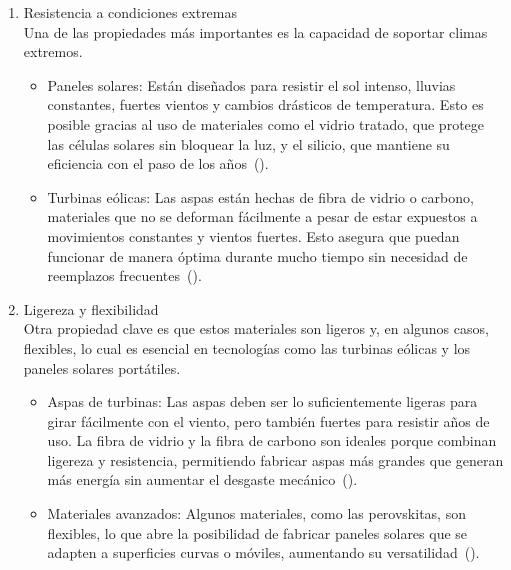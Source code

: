 \documentclass[letterpaper, 12pt]{article}
\begin{document}
\begin{enumerate}
      \item Resistencia a condiciones extremas \\ Una de las propiedades más importantes es
            la capacidad de soportar climas extremos.
            \begin{itemize}
                  \item Paneles solares: Están diseñados para resistir el sol intenso, lluvias
                        constantes, fuertes vientos y cambios drásticos de temperatura. Esto es posible
                        gracias al uso de materiales como el vidrio tratado, que protege las células
                        solares sin bloquear la luz, y el silicio, que mantiene su eficiencia con el
                        paso de los años~(\cite{Henriksson2021}).
                  \item Turbinas eólicas: Las aspas están hechas de fibra de vidrio o carbono,
                        materiales que no se deforman fácilmente a pesar de estar expuestos a
                        movimientos constantes y vientos fuertes. Esto asegura que puedan funcionar de
                        manera óptima durante mucho tiempo sin necesidad de reemplazos
                        frecuentes~(\cite{Galembeck2019}).
            \end{itemize}

      \item Ligereza y flexibilidad \\ Otra propiedad clave es que estos materiales son
            ligeros y, en algunos casos, flexibles, lo cual es esencial en tecnologías como
            las turbinas eólicas y los paneles solares portátiles.
            \begin{itemize}
                  \item Aspas de turbinas: Las aspas deben ser lo suficientemente ligeras para girar
                        fácilmente con el viento, pero también fuertes para resistir años de uso. La
                        fibra de vidrio y la fibra de carbono son ideales porque combinan ligereza y
                        resistencia, permitiendo fabricar aspas más grandes que generan más energía sin
                        aumentar el desgaste mecánico~(\cite{Ebhota_Jen2019}).
                  \item Materiales avanzados: Algunos materiales, como las perovskitas, son flexibles,
                        lo que abre la posibilidad de fabricar paneles solares que se adapten a
                        superficies curvas o móviles, aumentando su versatilidad~(\cite{Abera2023}).
            \end{itemize}


\end{enumerate}
\end{document}
